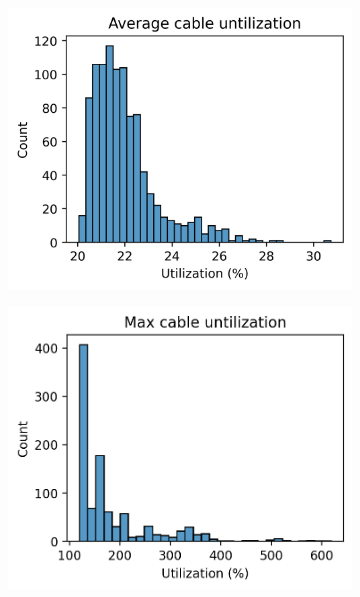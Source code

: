   \begin{figure}[H]
    \begin{subfigure}{.33\textwidth}
      \centering
      \includegraphics[width=\linewidth]{img/switchstate_exploring/urban2/histograms/avg_cable_util.png}
      \caption{}
      \label{fig:appendix:urban2:histograms:avg_cable}
    \end{subfigure}%
    \begin{subfigure}{.33\textwidth}
      \centering
      \includegraphics[width=\linewidth]{img/switchstate_exploring/urban2/histograms/max_cable_util.png}

\end{subfigure}
\end{figure}
